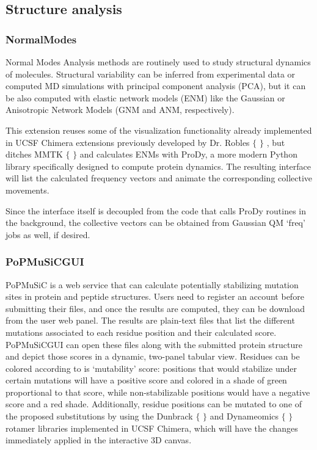 \subsection{Structure analysis}
\subsubsection{NormalModes}
Normal Modes Analysis methods are routinely used to study structural dynamics of molecules. Structural variability can be inferred from experimental data or computed MD simulations with principal component analysis (PCA), but it can be also computed with elastic network models (ENM) like the Gaussian or Anisotropic Network Models (GNM and ANM, respectively).

This extension reuses some of the visualization functionality already implemented in UCSF Chimera extensions previously developed by Dr. Robles $ \{ $ $ \} $ , but ditches MMTK $ \{ $ $ \} $  and calculates ENMs with ProDy, a more modern Python library specifically designed to compute protein dynamics. The resulting interface will list the calculated frequency vectors and animate the corresponding collective movements.

Since the interface itself is decoupled from the code that calls ProDy routines in the background, the collective vectors can be obtained from Gaussian QM ‘freq’ jobs as well, if desired.

\subsubsection{PoPMuSiCGUI}
PoPMuSiC is a web service that can calculate potentially stabilizing mutation sites in protein and peptide structures. Users need to register an account before submitting their files, and once the results are computed, they can be download from the user web panel. The results are plain-text files that list the different mutations associated to each residue position and their calculated score. PoPMuSiCGUI can open these files along with the submitted protein structure and depict those scores in a dynamic, two-panel tabular view. Residues can be colored according to is ‘mutability’ score: positions that would stabilize under certain mutations will have a positive score and colored in a shade of green proportional to that score, while non-stabilizable positions would have a negative score and a red shade. Additionally, residue positions can be mutated to one of the proposed substitutions by using the Dunbrack $ \{ $ $ \} $  and Dynameomics $ \{ $ $ \} $  rotamer libraries implemented in UCSF Chimera, which will have the changes immediately applied in the interactive 3D canvas.





